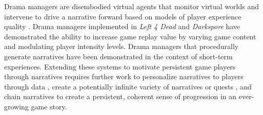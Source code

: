 \documentclass[conference]{IEEEtran}
\newcommand{\mytodo}[1]{\textbf{[[#1]]}}
\begin{document}
Drama %
managers are disembodied virtual agents that monitor virtual worlds and intervene to drive a narrative forward based on models of player experience quality \cite{riedl2013:in-aimag}.
Drama managers implemented in {\em Left 4 Dead} and {\em Darkspore} have demonstrated the ability to increase game replay value by varying game content and modulating player intensity levels.
Drama managers that procedurally generate narratives have been demonstrated in the context of short-term experiences.
Extending these systems to motivate persistent game players through narratives requires further work to personalize narratives to players through data \cite{yu2012:prefix-based}, create a potentially infinite variety of narratives or quests \cite{li2012:crowdsource-narr-int}, and chain narratives to create a persistent, coherent sense of progression in an ever-growing game story.


\end{document}

